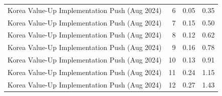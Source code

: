 \begin{table}
\begin{tabular}{lrrr}
Korea Value-Up Implementation Push (Aug 2024) & 6 & 0.05 & 0.35 \\
Korea Value-Up Implementation Push (Aug 2024) & 7 & 0.15 & 0.50 \\
Korea Value-Up Implementation Push (Aug 2024) & 8 & 0.12 & 0.62 \\
Korea Value-Up Implementation Push (Aug 2024) & 9 & 0.16 & 0.78 \\
Korea Value-Up Implementation Push (Aug 2024) & 10 & 0.13 & 0.91 \\
Korea Value-Up Implementation Push (Aug 2024) & 11 & 0.24 & 1.15 \\
Korea Value-Up Implementation Push (Aug 2024) & 12 & 0.27 & 1.43 \\
\bottomrule
\end{tabular}
\end{table}
